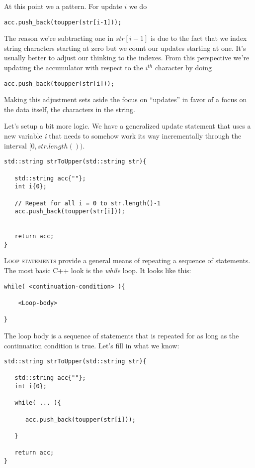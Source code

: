 \documentclass[]{tufte-handout}
\begin{document}
At this point we a pattern. For update $i$ we do 
\begin{verbatim}
acc.push_back(toupper(str[i-1]));
\end{verbatim}
The reason we're subtracting one in $str[i-1]$ is due to the fact that we index string characters starting at zero but we count our updates starting at one. It's usually better to adjust our thinking to the indexes.  From this perspective we're updating the accumulator with respect  to the $i^{th}$ character by doing
\begin{verbatim}
acc.push_back(toupper(str[i]));
\end{verbatim}
Making this adjustment sets aside the focus on ``updates'' in favor of a focus on the data itself, the characters in the string.  

Let's setup a bit more logic. We have a generalized update statement that uses a new variable \textit{i} that needs to somehow work its way incrementally through the interval $[0,str.length())$.
\begin{verbatim}
std::string strToUpper(std::string str){
   
   std::string acc{""};   
   int i{0}; 	
   
   // Repeat for all i = 0 to str.length()-1
   acc.push_back(toupper(str[i]));
  
   
   return acc;
}
\end{verbatim}

\textsc{Loop statements} provide a general means of repeating a sequence of statements. The most basic C++ look is the \textit{while} loop.  It looks like this:
\begin{verbatim}
while( <continuation-condition> ){
    
    <Loop-body>
   
}
\end{verbatim}
The loop body is a sequence of statements that is repeated for as long as the continuation condition is true. Let's fill in what we know:
\begin{verbatim}
std::string strToUpper(std::string str){
   
   std::string acc{""};   
   int i{0}; 	
   
   while( ... ){

      acc.push_back(toupper(str[i]));
  
   }
   
   return acc;
}
\end{verbatim}
\end{document}
